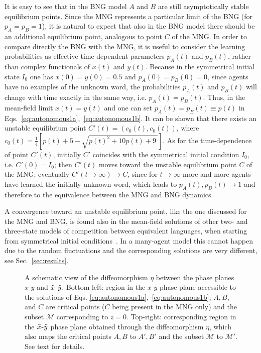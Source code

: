 \documentclass[review]{elsarticle}
\newcommand{\tx}{\Tilde{x}}
\newcommand{\ty}{\Tilde{y}}
\newcommand{\+}{\! + \!}
\begin{document}
It is easy to see that in the BNG model $A$ and $B$ are still asymptotically stable equilibrium points.
Since the MNG represents a particular limit of the BNG (for $p_A = p_B = 1$), it is natural to expect that also in the BNG model there should be an additional equilibrium point, analogous to point $C$ of the MNG.
In order to compare directly the BNG with the MNG, it is useful to consider the learning probabilities as effective time-dependent parameters $p_A(t)$ and $p_B(t)$, rather than complex functionals of $x(t)$ and $y(t)$.
Because in the symmetrical initial state $I_0$ one has $x(0) = y(0) = 0.5$ and $p_A(0) = p_B(0) = 0$, since agents have no examples of the unknown word, the probabilities $p_A(t)$ and $p_B(t)$ will change with time exactly in the same way, i.e. $p_A(t) = p_B(t)$.
Thus, in the mean-field limit $x(t) = y(t)$ and one can set $p_A(t) = p_B(t) \equiv p(t)$ in Eqs.~\eqref{eq:autonomous1a},~\eqref{eq:autonomous1b}. 
It can be shown that there exists an unstable equilibrium point $C'(t) = (c_0(t),c_0(t))$, 
where $c_0(t) = \frac{1}{4}\left[p(t) + 5 - \sqrt{p(t)^2 + 10 p(t) + 9~}\right]$.
As for the time-dependence of point $C'(t)$, initially $C'$ coincides with the symmetrical initial condition $I_0$, i.e. $C'(0) = I_0$; then $C'(t)$ moves toward the unstable equilibrium point $C$ of the MNG; eventually $C'(t\!\to\!\infty) \to C$, since for $t\!\to\!\infty$ more and more agents have learned the initially unknown word, which leads to $p_A(t), p_B(t) \to 1$ and therefore to the equivalence between the MNG and BNG dynamics.


A convergence toward an unstable equilibrium point, like the one discussed for the MNG and BNG, is found also in the mean-field solutions of other two- and three-state models of competition between equivalent languages, when starting from symmetrical initial conditions~\cite{Stauffer-2007a,Vazquez-2010a}. 
In a many-agent model this cannot happen due to the random fluctuations and the corresponding solutions are very different, see Sec.~\ref{sec:results}. 


\begin{figure}[ht!]
    \caption{
        A schematic view  of the diffeomorphism $\eta$    between the phase planes   $x$-$y$ and $\tx$-$\ty$.
        Bottom-left: 
            region in the $x$-$y$ phase plane accessible to the solutions of Eqs. \eqref{eq:autonomous1a},~\eqref{eq:autonomous1b}; 
            $A, B$, and $C$ are critical points ($C$ being present in the MNG only) and the subset $\mathcal{M}$ corresponding to $z=0$.
        Top-right: 
            corresponding region in the $\tx$-$\ty$ phase plane obtained through the diffeomorphism $\eta$, which also maps the critical points $A, B$ to $A', B'$ and the subset $\mathcal{M}$ to $\mathcal{M'}$.
        See text for details.
    }
    \label{fig:phaseSpace}
\end{figure}
\end{document}
